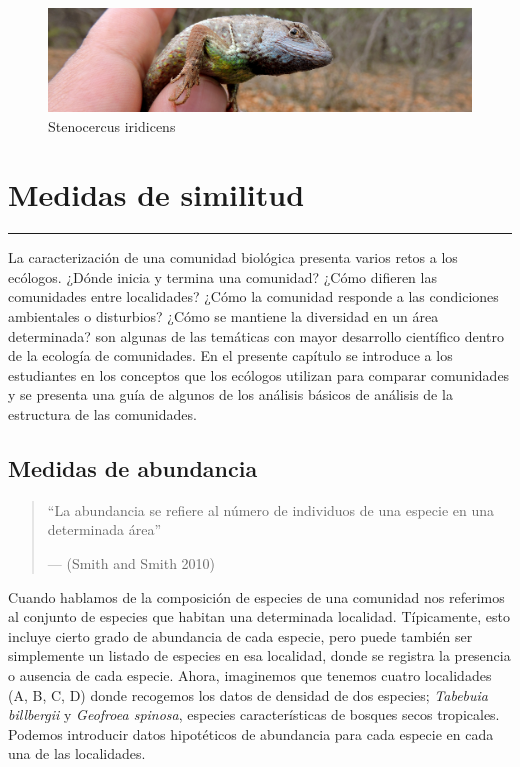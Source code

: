 \documentclass[]{book}
\begin{document}
\begin{figure}[htbp]
\centering
\includegraphics{lagar.jpg}
\caption{Stenocercus iridicens}
\end{figure}

\chapter{Medidas de similitud}\label{medidas-de-similitud}

\begin{center}\rule{0.5\linewidth}{\linethickness}\end{center}

La caracterización de una comunidad biológica presenta varios retos a
los ecólogos. ¿Dónde inicia y termina una comunidad? ¿Cómo difieren las
comunidades entre localidades? ¿Cómo la comunidad responde a las
condiciones ambientales o disturbios? ¿Cómo se mantiene la diversidad en
un área determinada? son algunas de las temáticas con mayor desarrollo
científico dentro de la ecología de comunidades. En el presente capítulo
se introduce a los estudiantes en los conceptos que los ecólogos
utilizan para comparar comunidades y se presenta una guía de algunos de
los análisis básicos de análisis de la estructura de las comunidades.

\section{Medidas de abundancia}\label{medidas-de-abundancia}

\begin{quote}
``La abundancia se refiere al número de individuos de una especie en una
determinada área''

--- (Smith and Smith 2010)
\end{quote}

Cuando hablamos de la composición de especies de una comunidad nos
referimos al conjunto de especies que habitan una determinada localidad.
Típicamente, esto incluye cierto grado de abundancia de cada especie,
pero puede también ser simplemente un listado de especies en esa
localidad, donde se registra la presencia o ausencia de cada especie.
Ahora, imaginemos que tenemos cuatro localidades (A, B, C, D) donde
recogemos los datos de densidad de dos especies; \emph{Tabebuia
billbergii} y \emph{Geofroea spinosa}, especies características de
bosques secos tropicales. Podemos introducir datos hipotéticos de
abundancia para cada especie en cada una de las localidades.
\end{document}
